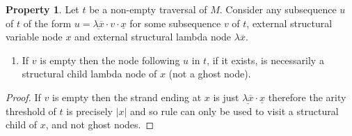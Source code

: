 \documentclass{article}
\theoremstyle{definition}
\newtheorem{property}{Property}[section]
\begin{document}
\begin{property}
\label{prop:strand_spinaldescent}
Let $t$ be a non-empty traversal of $M$.
Consider any subsequence $u$ of $t$ of the form
$u = \underline{\lambda \overline{x}} \cdot v \cdot \underline{x}$
for some subsequence $v$ of $t$, external structural variable node $x$ and external structural lambda node $\lambda \overline{x}$.
\begin{enumerate}[label=(\roman*)]
  \item If $v$ is empty then the node following $u$ in $t$, if it exists, is necessarily a structural child lambda node of $x$ (not a ghost node).
\end{enumerate}
\end{property}
\begin{proof}
 If $v$ is empty then the strand ending at $x$
 is just $\underline{\lambda \overline{x}} \cdot \underline{x}$ therefore
 the arity threshold of $t$ is precisely $|x|$ and so rule  can only be used to visit a structural child of $x$, and not ghost nodes.
\end{proof}
\end{document}

